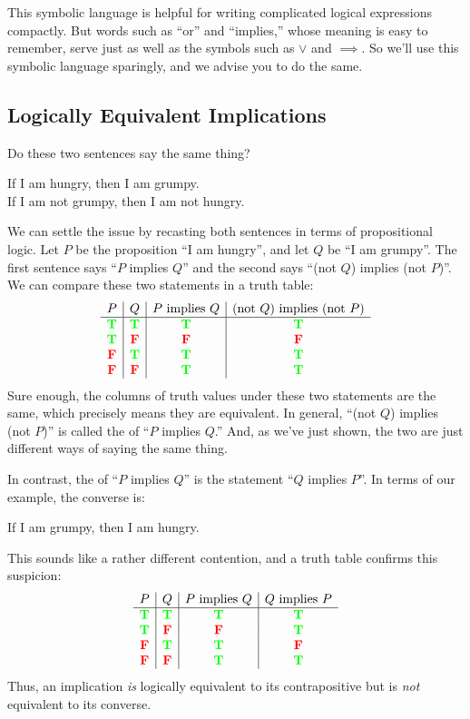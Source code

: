 This symbolic language is helpful for writing complicated logical
expressions compactly.  But words such as ``or'' and ``implies,'' whose
meaning is easy to remember, serve just as well as the symbols such as
$\vee$ and $\implies$.  So we'll use this symbolic language sparingly, and
we advise you to do the same.

\subsection{Logically Equivalent Implications}

Do these two sentences say the same thing?
%
\begin{center}
If I am hungry, then I am grumpy. \\
If I am not grumpy, then I am not hungry.
\end{center}
%
We can settle the issue by recasting both sentences in terms of
propositional logic.  Let $P$ be the proposition ``I am hungry'', and
let $Q$ be ``I am grumpy''.  The first sentence says ``$P$ implies
$Q$'' and the second says ``(not $Q$) implies (not $P$)''.  We can
compare these two statements in a truth table:
%
\[
\begin{array}{c|c|c|c}
P & Q &
    \text{$P$ implies $Q$} &
    \text{(not $Q$) implies (not $P$)} \\ \hline
\textcolor{green}{\mathbf{T}} & \textcolor{green}{\mathbf{T}} & \textcolor{green}{\mathbf{T}} & \textcolor{green}{\mathbf{T}} \\
\textcolor{green}{\mathbf{T}} & \textcolor{red}{\mathbf{F}} & \textcolor{red}{\mathbf{F}} & \textcolor{red}{\mathbf{F}} \\
\textcolor{red}{\mathbf{F}} & \textcolor{green}{\mathbf{T}} & \textcolor{green}{\mathbf{T}} & \textcolor{green}{\mathbf{T}} \\
\textcolor{red}{\mathbf{F}} & \textcolor{red}{\mathbf{F}} & \textcolor{green}{\mathbf{T}} & \textcolor{green}{\mathbf{T}}
\end{array}
\]
%
Sure enough, the columns of truth values under these two statements are
the same, which precisely means they are equivalent.  In general, ``(not
$Q$) implies (not $P$)'' is called the  of ``$P$
implies $Q$.''  And, as we've just shown, the two are just different ways
of saying the same thing.

In contrast, the  of ``$P$ implies $Q$'' is the
statement ``$Q$ implies $P$''.  In terms of our example, the converse
is:
%
\begin{center}
If I am grumpy, then I am hungry.
\end{center}
%
This sounds like a rather different contention, and a truth table
confirms this suspicion:
%
\[
\begin{array}{c|c|c|c}
P & Q &
    \text{$P$ implies $Q$} &
    \text{$Q$ implies $P$} \\ \hline
\textcolor{green}{\mathbf{T}} & \textcolor{green}{\mathbf{T}} & \textcolor{green}{\mathbf{T}} & \textcolor{green}{\mathbf{T}} \\
\textcolor{green}{\mathbf{T}} & \textcolor{red}{\mathbf{F}} & \textcolor{red}{\mathbf{F}} & \textcolor{green}{\mathbf{T}} \\
\textcolor{red}{\mathbf{F}} & \textcolor{green}{\mathbf{T}} & \textcolor{green}{\mathbf{T}} & \textcolor{red}{\mathbf{F}} \\
\textcolor{red}{\mathbf{F}} & \textcolor{red}{\mathbf{F}} & \textcolor{green}{\mathbf{T}} & \textcolor{green}{\mathbf{T}}
\end{array}
\]
%
Thus, an implication \textit{is} logically equivalent to its
contrapositive but is \textit{not} equivalent to its converse.

